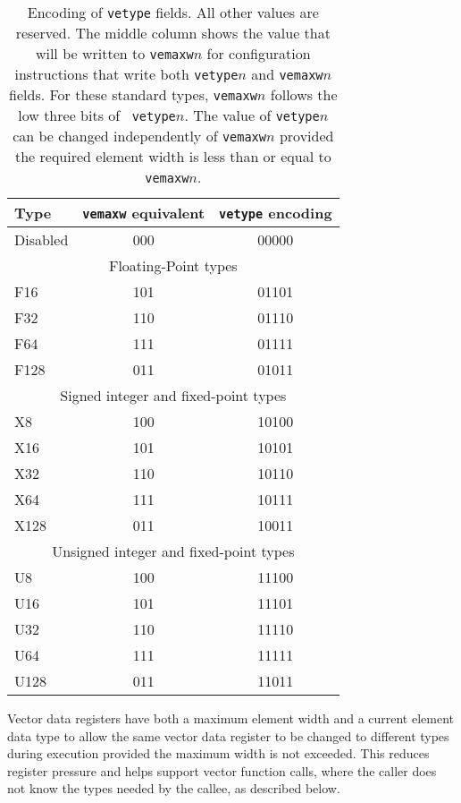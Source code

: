 \begin{table}[hbt]
  \centering
  \begin{tabular}{|l|c|c|}
    \hline
    Type & {\tt vemaxw} equivalent & {\tt vetype} encoding \\
    \hline
    Disabled & 000 & 00000 \\
    \hline
    \hline
    \multicolumn{3}{|c|}{Floating-Point types} \\
    \hline
    F16      & 101 & 01101 \\
    F32      & 110 & 01110 \\
    F64      & 111 & 01111 \\
    F128     & 011 & 01011 \\
    \hline
    \hline
    \multicolumn{3}{|c|}{Signed integer and fixed-point types} \\
    \hline
    X8       & 100 & 10100  \\
    X16      & 101 & 10101  \\
    X32      & 110 & 10110  \\
    X64      & 111 & 10111  \\
    X128     & 011 & 10011  \\
    \hline
    \hline
    \multicolumn{3}{|c|}{Unsigned integer and fixed-point types} \\
    \hline
    U8      & 100 & 11100  \\
    U16     & 101 & 11101  \\
    U32     & 110 & 11110  \\
    U64     & 111 & 11111  \\
    U128    & 011 & 11011  \\
    \hline
  \end{tabular}
  \caption{Encoding of {\tt vetype} fields.  All other values are
    reserved. The middle column shows the value that will be written
    to {\tt vemaxw}$n$ for configuration instructions that write both
    {\tt vetype}$n$ and {\tt vemaxw}$n$ fields. For these standard
    types, {\tt vemaxw}$n$ follows the low three bits of {\tt
      vetype}$n$. The value of {\tt vetype}$n$ can be changed
    independently of {\tt vemaxw}$n$ provided the required element
    width is less than or equal to {\tt vemaxw}$n$.}
  \label{tab:vetype}
\end{table}

\begin{commentary}
  Vector data registers have both a maximum element width and a
  current element data type to allow the same vector data register to
  be changed to different types during execution provided the
  maximum width is not exceeded.  This reduces register pressure and
  helps support vector function calls, where the caller does not know
  the types needed by the callee, as described below.
\end{commentary}

